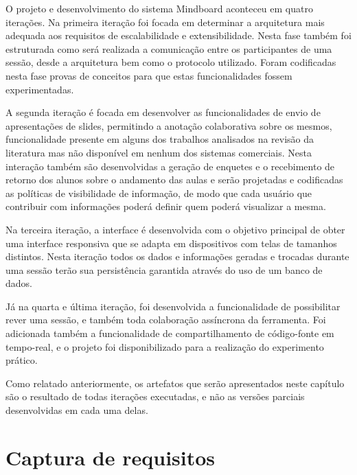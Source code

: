 
O projeto e desenvolvimento do sistema Mindboard aconteceu em quatro iterações. Na primeira iteração foi focada em determinar a arquitetura mais adequada aos requisitos de escalabilidade e extensibilidade. Nesta fase também foi estruturada como será realizada a comunicação entre os participantes de uma sessão, desde a arquitetura bem como o protocolo utilizado. Foram codificadas nesta fase provas de conceitos para que estas funcionalidades fossem experimentadas.

A segunda iteração é focada em desenvolver as funcionalidades de envio de apresentações de slides, permitindo a anotação colaborativa sobre os mesmos, funcionalidade presente em alguns dos trabalhos analisados na revisão da literatura mas não disponível em nenhum dos sistemas comerciais. Nesta interação também são desenvolvidas a geração de enquetes e o recebimento de retorno dos alunos sobre o andamento das aulas e serão projetadas e codificadas as políticas de visibilidade de informação, de modo que cada usuário que contribuir com informações poderá definir quem poderá visualizar a mesma.

Na terceira iteração, a interface é desenvolvida com o objetivo principal de obter uma interface responsiva que se adapta em dispositivos com telas de tamanhos distintos. Nesta iteração todos os dados e informações geradas e trocadas durante uma sessão terão sua persistência garantida através do uso de um banco de dados.

Já na quarta e última iteração, foi desenvolvida a funcionalidade de possibilitar rever uma sessão, e também toda colaboração assíncrona da ferramenta. Foi adicionada também a funcionalidade de compartilhamento de código-fonte em tempo-real, e o projeto foi disponibilizado para a realização do experimento prático.

Como relatado anteriormente, os artefatos que serão apresentados neste capítulo são o resultado de todas iterações executadas, e não as versões parciais desenvolvidas em cada uma delas.

\section{Captura de requisitos}

